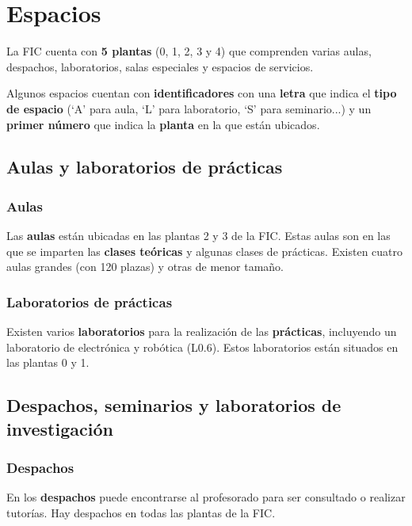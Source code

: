 \section{Espacios}

La \acrshort{FIC} cuenta con \textbf{5 plantas} (0, 1, 2, 3 y 4) que comprenden varias aulas, despachos, laboratorios, salas especiales y espacios de servicios.

\begin{infoBox}
    Algunos espacios cuentan con \textbf{identificadores} con una \textbf{letra} que indica el \textbf{tipo de espacio} (`A' para aula, `L' para laboratorio, `S' para seminario...) y un \textbf{primer número} que indica la \textbf{planta} en la que están ubicados.
\end{infoBox}

\subsection{Aulas y laboratorios de prácticas}

\subsubsection{Aulas}

Las \textbf{aulas} están ubicadas en las plantas 2 y 3 de la 
\acrshort{FIC}. Estas aulas son en las que se imparten las \textbf{clases teóricas} y algunas clases de prácticas. Existen cuatro aulas grandes (con 120 plazas) y otras de menor tamaño.

\subsubsection{Laboratorios de prácticas}

Existen varios \textbf{laboratorios} para la realización de las \textbf{prácticas}, incluyendo un laboratorio de electrónica y robótica (L0.6). Estos laboratorios están situados en las plantas 0 y 1.

\subsection{Despachos, seminarios y laboratorios de investigación}

\subsubsection{Despachos}

En los \textbf{despachos} puede encontrarse al profesorado para ser consultado o realizar tutorías. Hay despachos en  todas las plantas de la \acrshort{FIC}.

